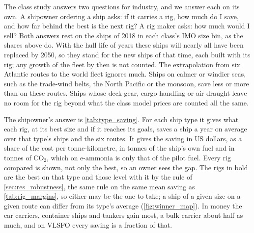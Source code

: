 The class study answers two questions for industry, and we answer each on its own. A shipowner ordering a ship asks: if it carries a rig, how much do I save, and how far behind the best is the next rig? A rig maker asks: how much would I sell? Both answers rest on the ships of 2018 in each class's IMO size bin, as the shares above do. With the hull life of  years these ships will nearly all have been replaced by 2050, so they stand for the new ships of that time, each built with its rig; any growth of the fleet by then is not counted. The extrapolation from six Atlantic routes to the world fleet ignores much. Ships on calmer or windier seas, such as the trade-wind belts, the North Pacific or the monsoon, save less or more than on these routes. Ships whose deck gear, cargo handling or air draught leave no room for the rig beyond what the class model prices are counted all the same.

The shipowner's answer is \cref{tab:type_saving}. For each ship type it gives what each rig, at its best size and if it reaches its goals, saves a ship a year on average over that type's ships and the six routes. It gives the saving in US dollars, as a share of the cost per tonne-kilometre, in tonnes of the ship's own fuel and in tonnes of CO$_2$, which on e-ammonia is only that of the pilot fuel. Every rig compared is shown, not only the best, so an owner sees the gap. The rigs in bold are the best on that type and those level with it by the rule of \cref{sec:res_robustness}, the same rule on the same mean saving as \cref{tab:rig_margins}, so either may be the one to take; a ship of a given size on a given route can differ from its type's average (\cref{fig:winner_map}). In money the car carriers, container ships and tankers gain most, a bulk carrier about half as much, and on VLSFO every saving is a fraction of that.

\begin{table}[tbp]
\centering
\footnotesize
\caption{What each rig compared at its best size saves a ship a year on each kind of ship, if each rig reaches its goals: in thousand US dollars, in tonnes of the ship's own fuel and in tonnes of tank-to-wake CO$_2$, on average over the kind's ships in the 2018 IMO fleet \citep{faber2020} and the six routes; and as a share of the cost per tonne-kilometre of the ship without a rig, the mean over the kind's classes and the six routes, as in \cref{tab:rig_margins}. In bold the best rig on that kind by that share and those level with it by the rule of \cref{sec:res_robustness}, none where no rig clearly saves. A negative saving is a loss. With perfect foresight of the weather. \savingerror}
\label{tab:type_saving}
\end{table}

